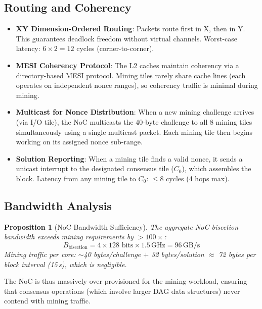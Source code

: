 \documentclass[11pt,a4paper]{article}
\newtheorem{proposition}[theorem]{Proposition}
\begin{document}
\subsection{Routing and Coherency}

\begin{itemize}
    \item \textbf{XY Dimension-Ordered Routing}: Packets route first in X, then in Y. This guarantees deadlock freedom without virtual channels. Worst-case latency: $6 \times 2 = 12$ cycles (corner-to-corner).
    \item \textbf{MESI Coherency Protocol}: The L2 caches maintain coherency via a directory-based MESI protocol. Mining tiles rarely share cache lines (each operates on independent nonce ranges), so coherency traffic is minimal during mining.
    \item \textbf{Multicast for Nonce Distribution}: When a new mining challenge arrives (via I/O tile), the NoC multicasts the 40-byte challenge to all 8 mining tiles simultaneously using a single multicast packet. Each mining tile then begins working on its assigned nonce sub-range.
    \item \textbf{Solution Reporting}: When a mining tile finds a valid nonce, it sends a unicast interrupt to the designated consensus tile ($C_0$), which assembles the block. Latency from any mining tile to $C_0$: $\leq 8$ cycles (4 hops max).
\end{itemize}

\subsection{Bandwidth Analysis}

\begin{proposition}[NoC Bandwidth Sufficiency]
The aggregate NoC bisection bandwidth exceeds mining requirements by $>100\times$:
\begin{equation}
    B_{\text{bisection}} = 4 \times 128 \text{ bits} \times 1.5\,\text{GHz} = 96\,\text{GB/s}
\end{equation}
Mining traffic per core: $\sim$40 bytes/challenge $+$ 32 bytes/solution $\approx$ 72 bytes per block interval (15\,s), which is negligible.
\end{proposition}

The NoC is thus massively over-provisioned for the mining workload, ensuring that consensus operations (which involve larger DAG data structures) never contend with mining traffic.
\end{document}
